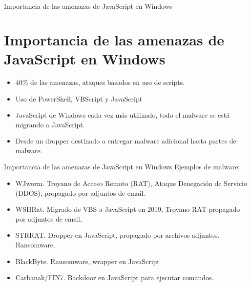 \documentclass[aspectratio=169]{beamer}
\begin{document}
    \begin{frame}{Importancia de las amenazas de JavaScript en Windows}
   	\section{Importancia de las amenazas de JavaScript en Windows}
   	
   	\begin{itemize}
   		\item 40\% de las amenazas, ataques basados en uso de scripts.
   		\item Uso de PowerShell, VBScript  y JavaScript
   		\item JavaScript de Windows cada vez más utilizado, todo el malware se está migrando a JavaScript.
   		\item Desde un dropper destinado a entregar malware adicional hasta partes de malware.
   
   	\end{itemize}
   	
   	\end{frame}
   	\begin{frame}{Importancia de las amenazas de JavaScript en Windows}
   	 Ejemplos de malware:
   	\begin{itemize}
   		\item WJworm. Troyano de Acceso Remoto (RAT), Ataque Denegación de Servicio (DDOS), propagado por adjuntos de email.
   		\item  WSHRat. Migrado de VBS a JavaScript en 2019, Troyano RAT propagado por adjuntos de email.
   		\item STRRAT. Dropper en JavaScript, propagado por archivos adjuntos. Ransomware.
   		\item BlackByte. Ransomware, wrapper en JavaScript
   		\item Carbanak/FIN7. Backdoor en JavaScript para ejecutar comandos.

   	\end{itemize}

   	\end{frame}
   	
\end{document}
